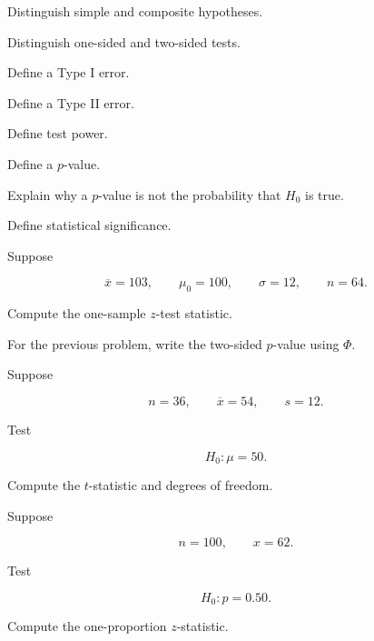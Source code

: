 \begin{exercise}[1]
Distinguish simple and composite hypotheses.
\end{exercise}

\begin{exercise}[1]
Distinguish one-sided and two-sided tests.
\end{exercise}

\begin{exercise}[1]
Define a Type I error.
\end{exercise}

\begin{exercise}[1]
Define a Type II error.
\end{exercise}

\begin{exercise}[1]
Define test power.
\end{exercise}

\begin{exercise}[1]
Define a \(p\)-value.
\end{exercise}

\begin{exercise}[1]
Explain why a \(p\)-value is not the probability that \(H_0\) is true.
\end{exercise}

\begin{exercise}[1]
Define statistical significance.
\end{exercise}

\begin{exercise}[2]
Suppose

\[
\overline{x}=103,
\qquad
\mu_0=100,
\qquad
\sigma=12,
\qquad
n=64.
\]

Compute the one-sample \(z\)-test statistic.
\end{exercise}

\begin{exercise}[2]
For the previous problem, write the two-sided \(p\)-value using
\(\Phi\).
\end{exercise}

\begin{exercise}[2]
Suppose

\[
n=36,
\qquad
\overline{x}=54,
\qquad
s=12.
\]

Test

\[
H_0:\mu=50.
\]

Compute the \(t\)-statistic and degrees of freedom.
\end{exercise}

\begin{exercise}[2]
Suppose

\[
n=100,
\qquad
x=62.
\]

Test

\[
H_0:p=0.50.
\]

Compute the one-proportion \(z\)-statistic.
\end{exercise}

